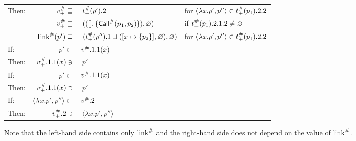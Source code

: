 \begin{center}
\begin{tabular}{|l@{\hskip2pt}r@{\hskip2pt}l@{\hskip2pt}l|}
		Then:           & ${v}^{\#}_+\sqsupseteq$                           & $\:{t}^{\#}_+(p').2$                                                              & for $\langle\lambda x.p',p''\rangle\in{t}^{\#}_+(p_1).2.2$ \\
		                & ${v}^{\#}_+\sqsupseteq$                           & $\:(([],\{{\textsf{Call}}^{\#}(p_1,p_2)\}),\varnothing)$                                      & if ${t}^{\#}_+(p_1).2.1.2\neq\varnothing$                  \\
		                & ${\text{link}}^{\#}(p')\sqsupseteq$                       & $\:({t}^{\#}_+(p'').1\sqcup([x\mapsto\{p_2\}],\varnothing),\varnothing)$          & for $\langle\lambda x.p',p''\rangle\in{t}^{\#}_+(p_1).2.2$ \\
		\hline
		If:             & $p'\in$                                          & ${v}^{\#}.1.1(x)$                                                                    &                                                              \\
		Then:           & ${v}^{\#}_+.1.1(x)\ni$                            & $\:p'$                                                                              &                                                              \\
		\hline
		If:             & $p'\in$                                          & ${v}^{\#}.1.1(x)$                                                                    &                                                              \\
		Then:           & ${v}^{\#}_+.1.1(x)\ni$                            & $\:p'$                                                                              &                                                              \\
		\hline
		If:             & $\langle\lambda x.p',p''\rangle\in$              & ${v}^{\#}.2$                                                                         &                                                              \\
		Then:           & ${v}^{\#}_+.2\ni$                                 & $\:\langle\lambda x.p',p''\rangle$                                                  &                                                              \\
		\hline
	\end{tabular}
\end{center}
Note that the left-hand side contains only ${\text{link}}^{\#}$ and the right-hand side does not depend on the value of ${\text{link}}^{\#}$.

